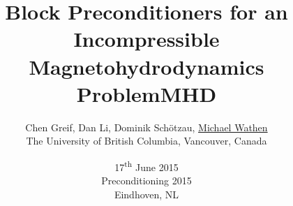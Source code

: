 \documentclass[12pt]{beamer}
\author[]{%
  Chen Greif, Dan Li, Dominik Sch\"{o}tzau, \underline{Michael Wathen} \\
  The University of British Columbia, Vancouver, Canada }
\title[]{Block Preconditioners for an Incompressible Magnetohydrodynamics Problem}
\date[]{17\textsuperscript{th} June 2015 \\ Preconditioning 2015 \\ Eindhoven, NL
}
\begin{document}
\begin{frame}
  \titlepage
\end{frame}



\title{MHD}







\end{document}
